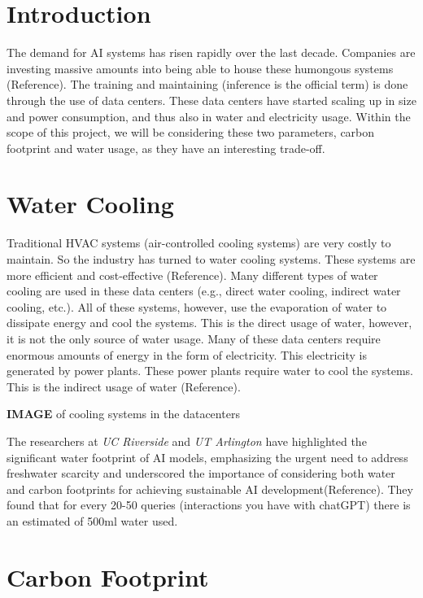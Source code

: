\documentclass[
]{article}
\author{}
\date{}
\begin{document}
\section{Introduction}\label{introduction}

The demand for AI systems has risen rapidly over the last decade.
Companies are investing massive amounts into being able to house these
humongous systems (Reference). The training and maintaining (inference
is the official term) is done through the use of data centers. These
data centers have started scaling up in size and power consumption, and
thus also in water and electricity usage. Within the scope of this
project, we will be considering these two parameters, carbon footprint
and water usage, as they have an interesting trade-off.

\section{Water Cooling}\label{water-cooling}

Traditional HVAC systems (air-controlled cooling systems) are very
costly to maintain. So the industry has turned to water cooling systems.
These systems are more efficient and cost-effective (Reference). Many
different types of water cooling are used in these data centers (e.g.,
direct water cooling, indirect water cooling, etc.). All of these
systems, however, use the evaporation of water to dissipate energy and
cool the systems. This is the direct usage of water, however, it is not
the only source of water usage. Many of these data centers require
enormous amounts of energy in the form of electricity. This electricity
is generated by power plants. These power plants require water to cool
the systems. This is the indirect usage of water (Reference).

\textbf{IMAGE} of cooling systems in the datacenters

The researchers at \emph{UC Riverside} and \emph{UT Arlington} have
highlighted the significant water footprint of AI models, emphasizing
the urgent need to address freshwater scarcity and underscored the
importance of considering both water and carbon footprints for achieving
sustainable AI development(Reference). They found that for every 20-50
queries (interactions you have with chatGPT) there is an estimated of
500ml water used.

\section{Carbon Footprint}\label{carbon-footprint}
\end{document}
